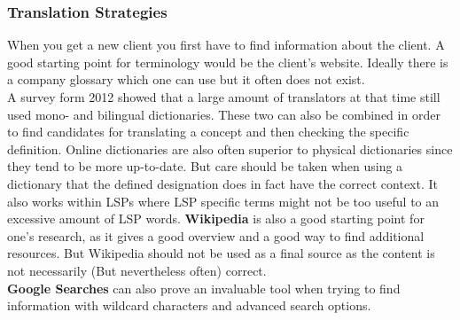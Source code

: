 \documentclass{article}
\begin{document}
	\subsubsection{Translation Strategies}
	When you get a new client you first have to find information about the client. A good starting point for terminology would be the client's website. Ideally there is a company glossary which one can use but it often does not exist. \\
	A survey form 2012 showed that a large amount of translators at that time still used mono- and bilingual dictionaries. These two can also be combined in order to find candidates for translating a concept and then checking the specific definition. Online dictionaries are also often superior to physical dictionaries since they tend to be more up-to-date. But care should be taken when using a dictionary that the defined designation does in fact have the correct context. It also works within LSPs where LSP specific terms might not be too useful to an excessive amount of LSP words.
	\textbf{Wikipedia} is also a good starting point for one's research, as it gives a good overview and a good way to find additional resources. But Wikipedia should not be used as a final source as the content is not necessarily (But nevertheless often) correct.\\
	\textbf{Google Searches} can also prove an invaluable tool when trying to find information with wildcard characters and advanced search options. \\
\end{document}

